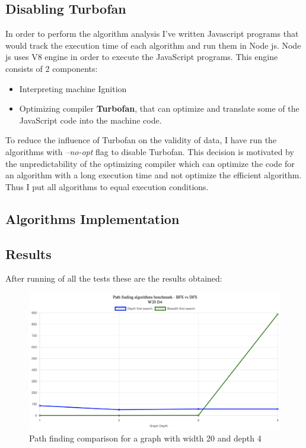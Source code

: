 \documentclass[12pt]{article}
\begin{document}
\subsection*{Disabling Turbofan}
In order to perform the algorithm analysis I've written Javascript programs that would track the execution time of each algorithm
and run them in Node js. Node js uses V8 engine in order to execute the JavaScript programs. This engine consists of 2 components:
\begin{itemize}
  \item Interpreting machine Ignition\cite{bytecoderef}
  \item Optimizing compiler \textbf{Turbofan}, that can optimize and translate some of the JavaScript code into the machine code.

\end{itemize}
To reduce the influence of Turbofan on the validity of data, 
I have run the algorithms with \textit{--no-opt} flag to disable Turbofan.
This decision is motivated by the unpredictability of the optimizing compiler which can 
optimize the code for an algorithm with a long execution time and not optimize the efficient algorithm.
Thus I put all algorithms to equal execution conditions.

\subsection*{Algorithms Implementation}

\subsection*{Results}
After running of all the tests these are the results obtained:
\begin{figure}[h]
    \centering
    \includegraphics[width=1\textwidth]{images/w20d4.png}
    \caption{Path finding comparison for a graph with width 20 and depth 4}
    \label{fig:w20d4}
\end{figure}
\end{document}
